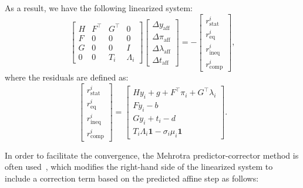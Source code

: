 \documentclass[conference]{IEEEtran}
\begin{document}
As a result, we have the following linearized system:
	\begin{equation}
		\begin{bmatrix}
		H & F^\top & G^\top & 0\\
		F & 0 & 0 & 0 \\
		G & 0 & 0 & I \\
		0 & 0 & T_i & \Lambda_i
		\end{bmatrix}
		\begin{bmatrix}
		\Delta y_{\text{aff}} \\
		\Delta \pi_{\text{aff}} \\
        \Delta \lambda_{\text{aff}} \\
		\Delta t_\text{aff}
		\end{bmatrix} = -
		\begin{bmatrix}
		r_{\mathrm{stat}}^i \\
		r_{\mathrm{eq}}^i \\
		r_{\mathrm{ineq}}^i \\
		r_{\mathrm{comp}}^i
		\end{bmatrix},
	\end{equation}
where the residuals are defined as:
\begin{equation}
        \begin{bmatrix}
		r_{\mathrm{stat}}^i \\
		r_{\mathrm{eq}}^i \\
		r_{\mathrm{ineq}}^i \\
		r_{\mathrm{comp}}^i
		\end{bmatrix}
        =
		\begin{bmatrix}
            Hy_i + g + F^\top \pi_i + G^\top \lambda_i \\
            Fy_i - b \\
            Gy_i + t_i - d \\
            T_i \Lambda_i \mathbf{1} - \sigma_i \mu_i \mathbf{1}
        \end{bmatrix}
        .
\end{equation}

In order to facilitate the convergence, the Mehrotra predictor-corrector method is often used~\cite{Mehrotra1992implementation}, 
which modifies the right-hand side of the linearized system to include a correction term based on the predicted affine step as follows:
\end{document}
